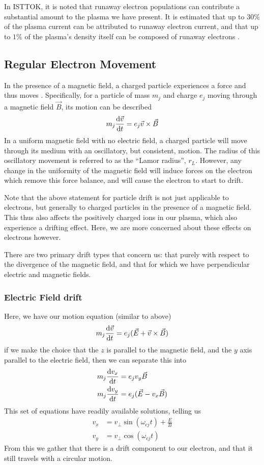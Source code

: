 In ISTTOK, it is noted that runaway electron populations can contribute a substantial amount to the plasma we have present. 
It is estimated that up to $30\%$ of the plasma current can be attributed to runaway electron current, and that up to $1\%$ of 
the plasma's density itself can be composed of runaway electrons \cite{isttok-runaways}. 

\subsection{Regular Electron Movement}

In the presence of a magnetic field, a charged particle experiences a force and thus moves \cite{wesson-tokamaks}. Specifically, for a 
particle of mass $m_j$ and charge $e_j$ moving through a magnetic field $\vec{B}$, its motion can be described
$$m_j \dv{\vec{v}}{t} = e_j \vec{v} \times \vec{B}$$
In a uniform magnetic field with no electric field, a charged particle will move through its medium with an 
oscillatory, but consistent, motion. The radius of this oscillatory movement is referred to as the ``Lamor radius'', $r_L$. 
However, any change in the uniformity of the magnetic field will induce 
forces on the electron which remove this force balance, and will cause the electron to start to drift.

\begin{remark}
    Note that the above statement for particle drift is not just applicable to electrons, but generally to charged particles 
    in the presence of a magnetic field. This thus also affects the positively charged ions in our plasma, which 
    also experience a drifting effect. Here, we are more concerned about these effects on electrons however.
\end{remark}

There are two primary drift types that concern us: that purely with respect to the divergence of the magnetic field, 
and that for which we have perpendicular electric and magnetic fields. 

\subsubsection{Electric Field drift}
Here, we have our motion equation (similar to above)
$$m_j \dv{\vec{v}}{t} = e_j (\vec{E} + \vec{v} \times \vec{B})$$
if we make the choice that the $z$ is parallel to the magnetic field, and the $y$ axis parallel to the electric field, then 
we can separate this into
\begin{align*}
    m_j \dv{v_x}{t} &= e_j v_y \vec{B} \\
    m_j \dv{v_y}{t} &= e_j (\vec{E} - v_x \vec{B})
\end{align*}
This set of equations have readily available solutions, telling us
\begin{align*}
    v_x &= v_{\perp} \sin (\omega_{cj} t) + \frac{E}{B} \\
    v_y &= v_{\perp} \cos (\omega_{cj} t)
\end{align*}
From this we gather that there is a drift component to our electron, and that it still travels with a circular motion.

